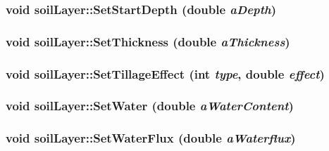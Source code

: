\label{classsoil_layer_a71a3ce45c63d49c19234d3223b8690af}
\hypertarget{classsoil_layer_a3c7e4208dd19b461a5fd4be87d4547b3}{
\subsubsection[{SetStartDepth}]{\setlength{\rightskip}{0pt plus 5cm}void soilLayer::SetStartDepth (double {\em aDepth})}}
\label{classsoil_layer_a3c7e4208dd19b461a5fd4be87d4547b3}
\hypertarget{classsoil_layer_ae1569e3fcbab8c73a3fdd6d6f6e7921a}{
\subsubsection[{SetThickness}]{\setlength{\rightskip}{0pt plus 5cm}void soilLayer::SetThickness (double {\em aThickness})}}
\label{classsoil_layer_ae1569e3fcbab8c73a3fdd6d6f6e7921a}
\hypertarget{classsoil_layer_a2260db621cbac80d6f348f8288e6b54f}{
\subsubsection[{SetTillageEffect}]{\setlength{\rightskip}{0pt plus 5cm}void soilLayer::SetTillageEffect (int {\em type}, \/  double {\em effect})}}
\label{classsoil_layer_a2260db621cbac80d6f348f8288e6b54f}
\hypertarget{classsoil_layer_aa1344b68a8f85cd0a3e65ead0569c761}{
\subsubsection[{SetWater}]{\setlength{\rightskip}{0pt plus 5cm}void soilLayer::SetWater (double {\em aWaterContent})}}
\label{classsoil_layer_aa1344b68a8f85cd0a3e65ead0569c761}
\hypertarget{classsoil_layer_a8b23d590179f5af403f95521d83aa98c}{
\subsubsection[{SetWaterFlux}]{\setlength{\rightskip}{0pt plus 5cm}void soilLayer::SetWaterFlux (double {\em aWaterflux})}}
